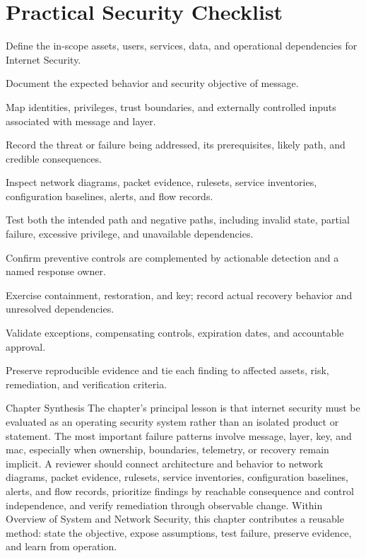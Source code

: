 \documentclass[11pt,letterpaper]{article}
\begin{document}
\section*{Practical Security Checklist}
\begin{CornellChecklist}
\item Define the in-scope assets, users, services, data, and operational dependencies for Internet Security.
\item Document the expected behavior and security objective of message.
\item Map identities, privileges, trust boundaries, and externally controlled inputs associated with message and layer.
\item Record the threat or failure being addressed, its prerequisites, likely path, and credible consequences.
\item Inspect network diagrams, packet evidence, rulesets, service inventories, configuration baselines, alerts, and flow records.
\item Test both the intended path and negative paths, including invalid state, partial failure, excessive privilege, and unavailable dependencies.
\item Confirm preventive controls are complemented by actionable detection and a named response owner.
\item Exercise containment, restoration, and key; record actual recovery behavior and unresolved dependencies.
\item Validate exceptions, compensating controls, expiration dates, and accountable approval.
\item Preserve reproducible evidence and tie each finding to affected assets, risk, remediation, and verification criteria.
\end{CornellChecklist}
\begin{CornellSummaryBox}{Chapter Synthesis}
The chapter's principal lesson is that internet security must be evaluated as an operating security system rather than an isolated product or statement. The most important failure patterns involve message, layer, key, and mac, especially when ownership, boundaries, telemetry, or recovery remain implicit. A reviewer should connect architecture and behavior to network diagrams, packet evidence, rulesets, service inventories, configuration baselines, alerts, and flow records, prioritize findings by reachable consequence and control independence, and verify remediation through observable change. Within Overview of System and Network Security, this chapter contributes a reusable method: state the objective, expose assumptions, test failure, preserve evidence, and learn from operation.
\end{CornellSummaryBox}
\end{document}
